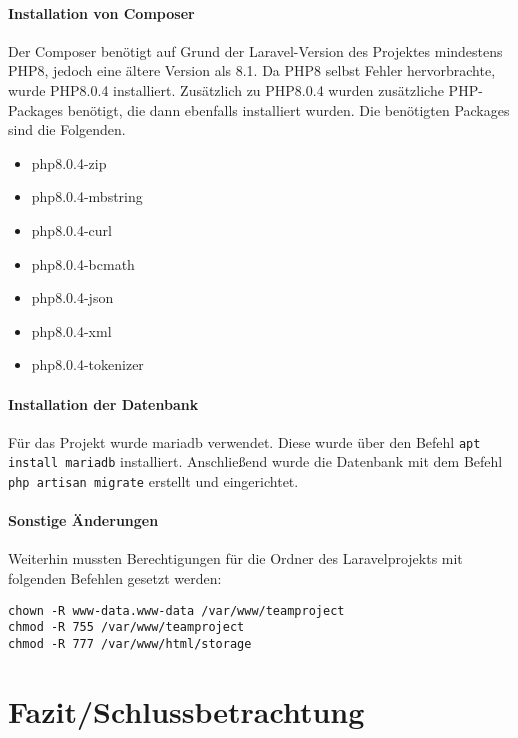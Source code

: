 \documentclass[12pt,a4paper]{scrartcl}
\newcommand{\code}[1]{\texttt{#1}}
\begin{document}
\paragraph{Installation von Composer}
Der Composer benötigt auf Grund der Laravel-Version des Projektes mindestens PHP8, jedoch eine ältere Version als 8.1. Da PHP8 selbst Fehler hervorbrachte, wurde PHP8.0.4 installiert.
Zusätzlich zu PHP8.0.4 wurden zusätzliche PHP-Packages benötigt, die dann ebenfalls installiert wurden. Die benötigten Packages sind die Folgenden.

\begin{itemize}
    \item php8.0.4-zip
    \item php8.0.4-mbstring
    \item php8.0.4-curl
    \item php8.0.4-bcmath
    \item php8.0.4-json
    \item php8.0.4-xml
    \item php8.0.4-tokenizer
\end{itemize}

\paragraph{Installation der Datenbank}
Für das Projekt wurde mariadb verwendet. Diese wurde über den Befehl \code{apt install mariadb} installiert.
Anschließend wurde die Datenbank mit dem Befehl \code{php artisan migrate} erstellt und eingerichtet.

\paragraph{Sonstige Änderungen}
Weiterhin mussten Berechtigungen für die Ordner des Laravelprojekts mit folgenden Befehlen gesetzt werden:

\begin{lstlisting}
chown -R www-data.www-data /var/www/teamproject
chmod -R 755 /var/www/teamproject
chmod -R 777 /var/www/html/storage
\end{lstlisting}

\section{Fazit/Schlussbetrachtung}
\end{document}
